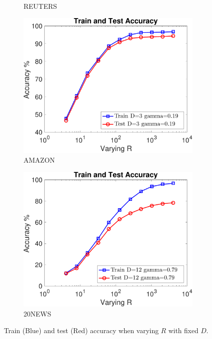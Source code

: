 \documentclass[11pt,a4paper]{article}
\newcommand{\1}{\boldsymbol{1}}
\begin{document}
\begin{figure}[htb]
\begin{subfigure}[b]{0.23\textwidth}
      \caption{REUTERS}
      \label{App:fig:exptsA_varyingR_r8}
     	\end{subfigure}
		\begin{subfigure}[b]{0.23\textwidth}
      \includegraphics[width=\textwidth]{Graphs/wmdk_varyingR/amazon_random_VaryingR_allSplits_CV_R512-eps-converted-to.pdf}
      \caption{AMAZON}
      \label{App:fig:exptsA_varyingR_amazon}
      \end{subfigure}
		\begin{subfigure}[b]{0.23\textwidth}
      \includegraphics[width=\textwidth]{Graphs/wmdk_varyingR/20ng2_500_random_VaryingR_allSplits_CV_R512-eps-converted-to.pdf}
      \caption{20NEWS}
      \label{App:fig:exptsA_varyingR_20ng2_500}
      \end{subfigure}
\caption{Train (Blue) and test (Red) accuracy when varying $R$ with fixed $D$.}
\label{App:fig:exptsA_varyingR}
\end{figure}
\end{document}

